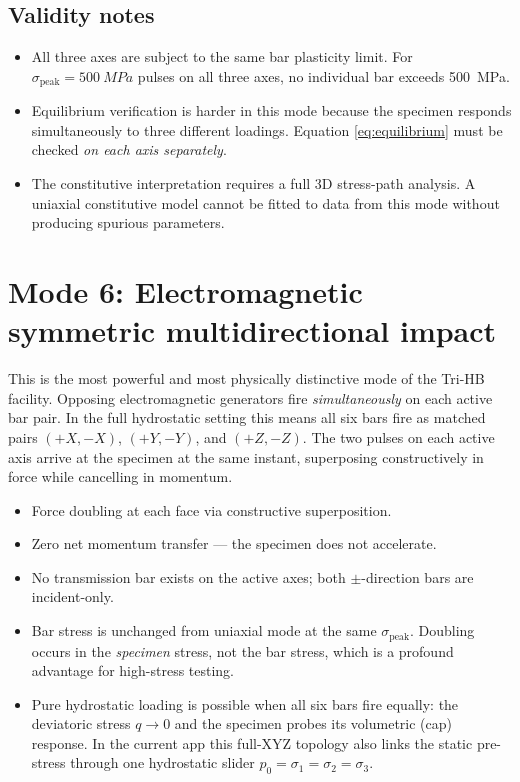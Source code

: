 \documentclass[11pt,a4paper,openany]{book}
\providecommand{\SI}[2]{\qty{#1}{#2}}
\theoremstyle{handbook}
\newcommand{\sig}{\sigma}
\newcommand{\sigpeak}{\sig_{\text{peak}}}
\begin{document}
\section{Validity notes}

\begin{itemize}[leftmargin=*]
  \item All three axes are subject to the same bar plasticity limit. For
        $\sigpeak=\SI{500}{MPa}$ pulses on all three axes, no individual
        bar exceeds \SI{500}{MPa}.
  \item Equilibrium verification is harder in this mode because the
        specimen responds simultaneously to three different loadings.
        Equation \eqref{eq:equilibrium} must be checked \emph{on each axis
        separately}.
  \item The constitutive interpretation requires a full 3D stress-path
        analysis. A uniaxial constitutive model cannot be fitted to data
        from this mode without producing spurious parameters.
\end{itemize}

\chapter{Mode 6: Electromagnetic symmetric multidirectional impact}\label{ch:mode6}

This is the most powerful and most physically distinctive mode of the Tri-HB
facility. Opposing electromagnetic generators fire \emph{simultaneously} on
each active bar pair. In the full hydrostatic setting this means all six bars
fire as matched pairs $(+X,-X)$, $(+Y,-Y)$, and $(+Z,-Z)$. The two pulses on
each active axis arrive at the specimen at the same instant, superposing
constructively in force while cancelling in momentum.

\begin{newfeature}
\begin{itemize}[leftmargin=*,itemsep=2pt]
  \item Force doubling at each face via constructive superposition.
  \item Zero net momentum transfer --- the specimen does not accelerate.
  \item No transmission bar exists on the active axes; both
        $\pm$-direction bars are incident-only.
  \item Bar stress is unchanged from uniaxial mode at the same $\sigpeak$.
        Doubling occurs in the \emph{specimen} stress, not the bar stress,
        which is a profound advantage for high-stress testing.
  \item Pure hydrostatic loading is possible when all six bars fire equally:
        the deviatoric stress $q\to 0$ and the specimen probes its
        volumetric (cap) response. In the current app this full-XYZ
        topology also links the static pre-stress through one hydrostatic
        slider $p_0=\sig_1=\sig_2=\sig_3$.
\end{itemize}
\end{newfeature}
\end{document}
